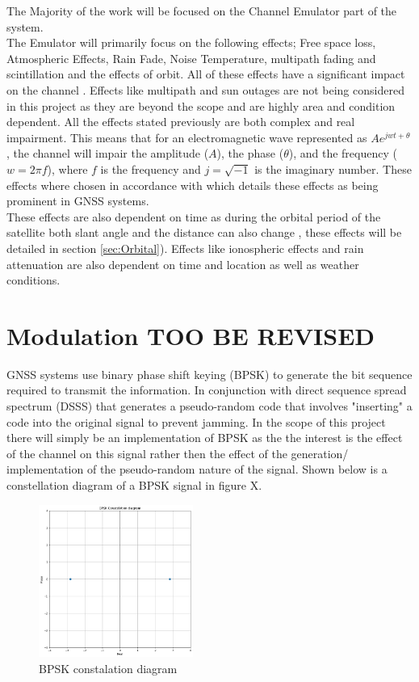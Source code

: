 \documentclass[conference]{IEEEtran}
\begin{document}
The Majority of the work will be focused on the Channel Emulator part of the system.\\

The Emulator will primarily focus on the following effects; Free space loss, Atmospheric Effects, Rain Fade, Noise Temperature, multipath fading and scintillation and the effects of orbit. All of these effects have a significant impact on the channel \cite{kaplan_understanding_2017}. Effects like multipath and sun outages are not being considered in this project as they are beyond the scope and are highly area and condition dependent. All the effects stated previously are both complex and real impairment. This means that for an electromagnetic wave represented as $Ae^{j w t+\theta}$, the channel will impair the amplitude ($A$), the phase ($\theta$), and the frequency ($w = 2\pi f$), where $f$ is the frequency and $j= \sqrt{-1}$ is the imaginary number. These effects where chosen in accordance with \cite{kaplan_understanding_2017} which details these effects as being prominent in GNSS systems.\\

These effects are also dependent on time as during the orbital period of the satellite both slant angle \cite{seybold_introduction_2005} and the distance can also change \cite{10.5555/2601574}, these effects will be detailed in section \ref{sec:Orbital}). Effects like ionospheric effects and rain attenuation are also dependent on time and location as well as weather conditions.
\label{sec:intro}


\section{Modulation TOO BE REVISED}
GNSS systems use binary phase shift keying (BPSK) to generate the bit sequence required to transmit the information. In conjunction with direct sequence spread spectrum (DSSS) that generates a pseudo-random code that involves "inserting" a code into the original signal to prevent jamming. In the scope of this project there will simply be an implementation of BPSK as the the interest is the effect of the channel on this signal rather then the effect of the generation/ implementation of the pseudo-random nature of the signal. Shown below is a constellation diagram of a BPSK signal in figure X.\\


\begin{figure}[h]
\centering
	\includegraphics[width = 0.45\textwidth]{BPSK_Diagram.png}
	\caption{BPSK constalation diagram}
	\label{fig:BPSK_Constalation}
\end{figure}
\end{document}
